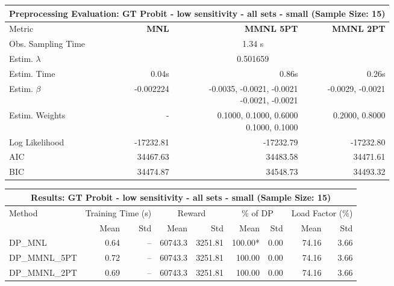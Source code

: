 
\begin{samepage}
\begin{center}
  \small
  \begin{tabular}{l|r|r|r}
    \toprule
    \multicolumn{4}{c}{\textbf{Preprocessing Evaluation: GT Probit - low sensitivity - all sets - small (Sample Size: 15)}} \\
    \midrule
    Metric & \textbf{MNL} & \textbf{MMNL 5PT} & \textbf{MMNL 2PT} \\
    \midrule
    Obs. Sampling Time & \multicolumn{3}{c}{1.34 s} \\
    Estim. $\lambda$ & \multicolumn{3}{c}{0.501659} \\
    Estim. Time & 0.04s & 0.86s & 0.26s \\
    Estim. $\beta$ & -0.002224 & \makecell[tr]{-0.0035, -0.0021, -0.0021 \\ -0.0021, -0.0021} & -0.0029, -0.0021 \\
    Estim. Weights & - & \makecell[tr]{0.1000, 0.1000, 0.6000 \\ 0.1000, 0.1000} & 0.2000, 0.8000 \\
    Log Likelihood & -17232.81 & -17232.79 & -17232.80 \\
    AIC & 34467.63 & 34483.58 & 34471.61 \\
    BIC & 34474.87 & 34548.73 & 34493.32 \\
    \bottomrule
  \end{tabular}
\end{center}
\begin{center}
  \small
  \begin{tabular}{l|rr|rr|rr|rr}
    \toprule
    \multicolumn{9}{c}{\textbf{Results: GT Probit - low sensitivity - all sets - small (Sample Size: 15)}} \\
    \midrule
    Method & \multicolumn{2}{c|}{Training Time (s)} & \multicolumn{2}{c|}{Reward} & \multicolumn{2}{c|}{\% of DP} & \multicolumn{2}{c}{Load Factor (\%)} \\
    & Mean & Std & Mean & Std & Mean & Std & Mean & Std \\
    \midrule
    DP\_MNL      &     0.64 &    -- &    60743.3 &    3251.81 & 100.00* &    0.00 &   74.16 &    3.66 \\
    DP\_MMNL\_5PT &     0.72 &    -- &    60743.3 &    3251.81 &  100.00 &    0.00 &   74.16 &    3.66 \\
    DP\_MMNL\_2PT &     0.69 &    -- &    60743.3 &    3251.81 &  100.00 &    0.00 &   74.16 &    3.66 \\

\end{tabular}
\end{center}
\end{samepage}
